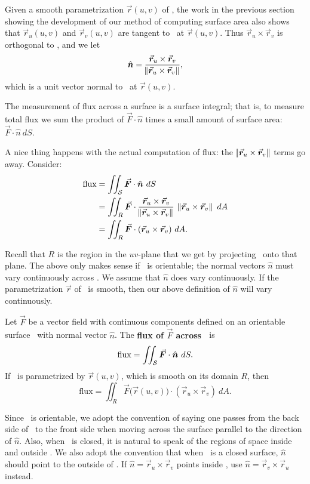 Given a smooth parametrization $\vec r(u,v)$ of \surfaceS, the work in the previous section showing the development of our method of computing surface area also shows that $\vec r_u(u,v)$ and $\vec r_v(u,v)$ are tangent to \surfaceS\ at $\vec r(u,v)$. Thus $\vec r_u\times \vec r_v$ is orthogonal to \surfaceS, and we let
$$\hat n = \frac{\vec r_u\times \vec r_v}{\norm{\vec r_u\times \vec r_v}},$$
which is a unit vector normal to \surfaceS\ at $\vec r(u,v)$.

The measurement of flux across a surface is a surface integral; that is, to measure total flux we sum the product of $\vec F\cdot\hat n$ times a small amount of surface area: $\vec F\cdot \hat n\ dS$. 

A nice thing happens with the actual computation of flux: the $\norm{\vec r_u\times \vec r_v}$ terms go away. Consider:
\begin{align*}
\text{flux} &= \iint_\surfaceS \vec F\cdot \hat n\ dS \\
				&= \iint_R \vec F\cdot \frac{\vec r_u\times \vec r_v}{\norm{\vec r_u\times \vec r_v}}\ \norm{\vec r_u\times \vec r_v}\ dA \\
				&= \iint_R \vec F\cdot (\vec r_u\times \vec r_v)\ dA.
\end{align*}

Recall that $R$ is the region in the $uv$-plane that we get by projecting \surfaceS\ onto that plane.  The above only makes sense if \surfaceS\ is orientable; the normal vectors $\hat n$ must vary continuously across \surfaceS. We assume that $\hat n$ does vary continuously. If the parametrization $\vec r$ of \surfaceS\ is smooth, then our above definition of $\hat n$ will vary continuously.

\begin{definition}
\label{def:surfflux}
Let $\vec F$ be a vector field with continuous components defined on an orientable surface \surfaceS\ with normal vector $\hat n$. The \textbf{flux of $\vec F$ across \surfaceS\ }is
$$\text{flux} = \iint_\surfaceS \vec F\cdot \hat n\ dS.$$
If \surfaceS\ is parametrized by $\vec r(u,v)$, which is smooth on its domain $R$, then
$$\text{flux} = \iint_R \vec F\big(\vec r(u,v)\big)\cdot (\vec r_u\times \vec r_v)\ dA.$$
\end{definition}

Since \surfaceS\ is orientable, we adopt the convention of saying one passes from the back side of \surfaceS\ to the front side when moving across the surface parallel to the direction of $\hat n$. Also, when \surfaceS\ is closed, it is natural to speak of the regions of space inside and outside \surfaceS. We also adopt the convention that when \surfaceS\ is a closed surface, $\hat n$ should point to the outside of \surfaceS. If $\hat n = \vec r_u\times\vec r_v$ points inside \surfaceS, use $\hat n = \vec r_v\times \vec r_u$ instead.

